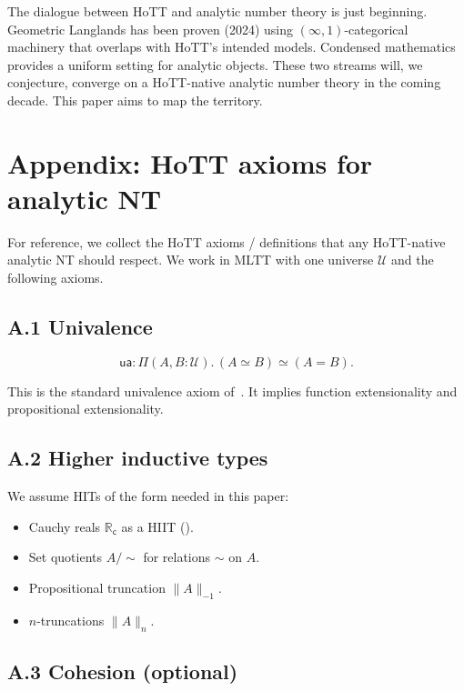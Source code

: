 \documentclass[12pt]{article}
\theoremstyle{definition}
\theoremstyle{remark}
\newcommand{\R}{\mathbb{R}}
\newcommand{\ua}{\mathsf{ua}}
\newcommand{\Rc}{\R_{\mathsf{c}}}
\begin{document}
The dialogue between HoTT and analytic number theory is just beginning.
Geometric Langlands has been proven (2024) using $(\infty,1)$-categorical
machinery that overlaps with HoTT's intended models. Condensed mathematics
provides a uniform setting for analytic objects. These two streams will,
we conjecture, converge on a HoTT-native analytic number theory in the
coming decade. This paper aims to map the territory.

\appendix

\section{Appendix: HoTT axioms for analytic NT}\label{app:axioms}

For reference, we collect the HoTT axioms / definitions that any
HoTT-native analytic NT should respect. We work in MLTT with one
universe $\mathcal{U}$ and the following axioms.

\subsection*{A.1 Univalence}

\begin{equation}\label{eq:univ}
\ua : \Pi(A,B:\mathcal{U}).\, (A \simeq B) \simeq (A = B).
\end{equation}

This is the standard univalence axiom of~\cite{HoTTBook}. It implies
function extensionality and propositional extensionality.

\subsection*{A.2 Higher inductive types}

We assume HITs of the form needed in this paper:
\begin{itemize}
\item Cauchy reals $\Rc$ as a HIIT ().
\item Set quotients $A/{\sim}$ for relations $\sim$ on $A$.
\item Propositional truncation $\|A\|_{-1}$.
\item $n$-truncations $\|A\|_n$.
\end{itemize}

\subsection*{A.3 Cohesion (optional)}
\end{document}
